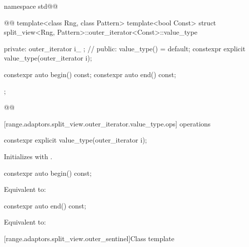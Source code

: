 \begin{codeblock}
namespace std@@ { @@
  template<class Rng, class Pattern>
  template<bool Const>
  struct split_view<Rng, Pattern>::outer_iterator<Const>::value_type {
  private:
    outer_iterator i_ {}; // \expos
  public:
    value_type() = default;
    constexpr explicit value_type(outer_iterator i);

    constexpr auto begin() const;
    constexpr auto end() const;
  };
}@\oldtxt{\}}@
\end{codeblock}

[range.adaptors.split_view.outer_iterator.value_type.ops]{ operations}

%
\begin{itemdecl}
constexpr explicit value_type(outer_iterator i);
\end{itemdecl}

\begin{itemdescr}
\pnum
\effects Initializes  with .
\end{itemdescr}

%
\begin{itemdecl}
constexpr auto begin() const;
\end{itemdecl}

\begin{itemdescr}
\pnum
\effects Equivalent to: 
\end{itemdescr}

%
\begin{itemdecl}
constexpr auto end() const;
\end{itemdecl}

\begin{itemdescr}
\pnum
\effects Equivalent to: 
\end{itemdescr}

[range.adaptors.split_view.outer_sentinel]{Class template }

\pnum
\begin{note}
\end{note}

